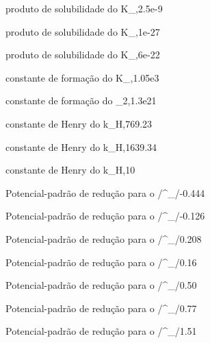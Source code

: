 {produto de solubilidade do }{K_{,}}{2.5e-9}{}



{produto de solubilidade do }{K_{,}}{1e-27}

{produto de solubilidade do }{K_{,}}{6e-22}


{constante de formação do }{K_{,}}{1.05e3}

{constante de formação do }{\beta_{2,}}{1.3e21}

{constante de Henry do }{k_{H,}}{769.23}{\atm\liter\per\mol}

{constante de Henry do }{k_{H,}}{1639.34}{\atm\liter\per\mol}


{constante de Henry do }{k_{H,}}{10}{\atm\liter\per\mol}

%                                              
%                                              

{Potencial-padrão de redução para o /}{^{\standardstate}_{/}}{-0.444}{\volt}

{Potencial-padrão de redução para o /}{^{\standardstate}_{/}}{-0.126}{\volt}

{Potencial-padrão de redução para o /}{^{\standardstate}_{/}}{0.208}{\volt}


{Potencial-padrão de redução para o /}{^{\standardstate}_{/}}{0.16}{\volt}

{Potencial-padrão de redução para o /}{^{\standardstate}_{/}}{0.50}{\volt}


{Potencial-padrão de redução para o /}{^{\standardstate}_{/}}{0.77}{\volt}


{Potencial-padrão de redução para o /}{^{\standardstate}_{/}}{1.51}{\volt}


